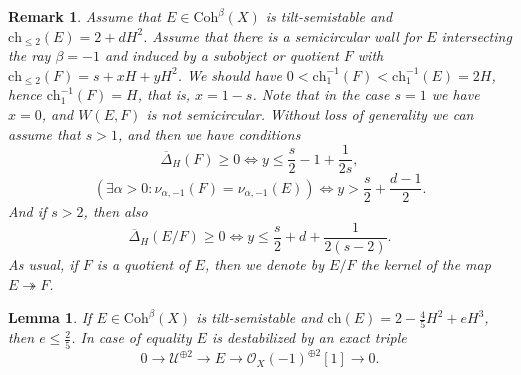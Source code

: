 \documentclass{amsart}
\newtheorem{lemma}[theorem]{Lemma}
\newtheorem{remark}[theorem]{Remark}
\begin{document}
	\begin{remark}\label{inequalities}Assume that $E\in\mathrm{Coh}^\beta(X)$ is tilt-semistable and $\mathrm{ch}_{\le 2}(E)=2+dH^2$. Assume that there is a semicircular wall for $E$ intersecting the ray $\beta=-1$ and induced by a subobject or quotient $F$ with $\mathrm{ch}_{\le 2}(F)=s+xH+yH^2$. We should have $0<\mathrm{ch}_1^{-1}(F)<\mathrm{ch}_1^{-1}(E)=2H$, hence $\mathrm{ch}_1^{-1}(F)=H$, that is, $x=1-s$. Note that in the case $s=1$ we have $x=0$, and $W(E,F)$ is not semicircular. Without loss of generality we can assume that $s>1$, and then we have conditions
		\begin{equation}\label{F positive}\overline{\Delta}_H(F)\ge 0\Leftrightarrow y\le\frac s2-1+\frac{1}{2s},
		\end{equation}
		\begin{equation}\label{wall at beta=-1}(\exists \alpha>0\colon\nu_{\alpha,-1}(F)=\nu_{\alpha,-1}(E))\Leftrightarrow y>\frac s2+\frac{d-1}{2}.
		\end{equation}
		And if $s>2$, then also
		\begin{equation}\label{E/F positive}\overline{\Delta}_H(E/F)\ge 0\Leftrightarrow y\le\frac s2+d+\frac{1}{2(s-2)}.
		\end{equation}
		As usual, if $F$ is a quotient of $E$, then we denote by $E/F$ the kernel of the map $E\twoheadrightarrow F$.
	\end{remark}
	
	\begin{lemma}
		\label{2 0 -4/5} If $E\in\mathrm{Coh}^\beta(X)$ is tilt-semistable and $\mathrm{ch}(E)=2-\frac 45H^2+eH^3$, then $e\le\frac 25$. In case of equality $E$ is destabilized by an exact triple
		\begin{equation}\label{triple3}0\to\mathcal U^{\oplus 2}\to E\to \mathcal O_X(-1)^{\oplus 2}[1]\to 0.
		\end{equation}
	\end{lemma}
	
\end{document}
